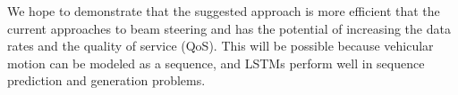 \documentclass[12pt,a4paper]{article}
\begin{document}
\par We hope to demonstrate that the suggested approach is more efficient that the current approaches to beam steering and has the potential of increasing the data rates and the quality of service (QoS). This will be possible because vehicular motion can be modeled as a sequence, and LSTMs perform well in sequence prediction and generation problems. 
\end{document}
